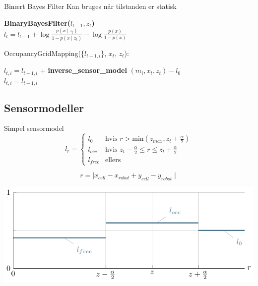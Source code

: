 \begin{frame}{Binært Bayes Filter}
Kan bruges når tilstanden er statisk

\begin{algorithm}[H]
\textbf{BinaryBayesFilter($l_{t-1}, z_t$)} \\
\Indp $l_t = l_{t-1} + \log \frac{p(x \mid z_t)}{1-p(x \mid z_t)} - \log \frac{p(x)}{1-p(x)}$ \\
\end{algorithm}
\end{frame}

\begin{frame}
\begin{algorithm}[H]
OccupancyGridMapping(\{$l_{t-1,i}$\}, $x_t$, $z_t$):

{
{ $ l_{t,i} = l_{t-1,i} $ + \textbf{inverse\_sensor\_model} $( m_i, x_t, z_t ) - l_0$\\ }
{ $ l_{t,i} = l_{t-1,i}  $\\ }
}
\end{algorithm}
\end{frame}

\subsection{Sensormodeller}
\begin{frame}{Simpel sensormodel}
\[
l_{r} = \begin{cases} 
	l_0 &\text{hvis }r > \text{min}(z_{max},z_t+\frac{\alpha}{2}) \\ 
	l_{occ} &\text{hvis } z_t-\frac{\alpha}{2} \leq r \leq z_t+\frac{\alpha}{2}\\ 
	l_{free} &\text{ellers}  
\end{cases}
\]

\[ r = \mid x_{cell} - x_{robot} + y_{cell} - y_{robot} \mid \]

\includegraphics{simple_sensormodel.pdf}
\end{frame}

